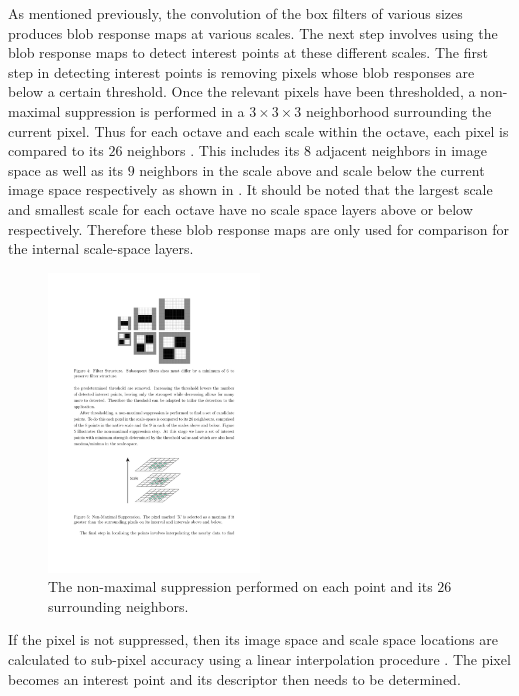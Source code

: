\documentclass{article}
\begin{document}
As mentioned previously, the convolution of the box filters of various sizes produces blob response maps at various scales. The next step involves using the blob response maps to detect interest points at these different scales. The first step in detecting interest points is removing pixels whose blob responses are below a certain threshold. Once the relevant pixels have been thresholded,  a non-maximal suppression is performed in a $3 \times 3 \times 3$ neighborhood surrounding the current pixel. Thus for each octave and each scale within the octave, each pixel is compared to its $26$ neighbors \cite{Evans2009}. This includes its $8$ adjacent neighbors in image space as well as its $9$ neighbors in the scale above and scale below the current image space respectively as shown in  \cite{Lowe2004}. It should be noted that the largest scale and smallest scale for each octave have no scale space layers above or below respectively. Therefore these blob response maps are only used for comparison for the internal scale-space layers. \\

\begin{figure}[h!] 
  \centering
    \includegraphics[width=0.5\textwidth]{../Drawings/methods/SURF2D_Nonmaximal_suppression.pdf}
    \caption{The non-maximal suppression performed on each point and its $26$ surrounding neighbors.}
    \label{fig:imageSpace}
\end{figure}

If the pixel is not suppressed, then its image space and scale space locations are calculated to sub-pixel accuracy using a linear interpolation procedure \cite{Evans2009}. The pixel becomes an interest point and its descriptor then needs to be determined.\\
\end{document}
